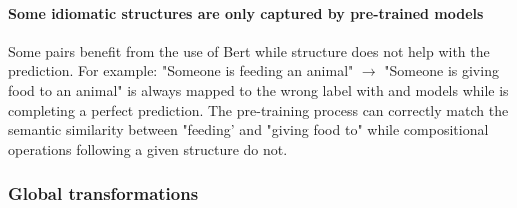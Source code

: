 \paragraph{Some idiomatic structures are only captured by pre-trained models}

Some pairs benefit from the use of Bert while structure does not help with the prediction. For example: "Someone is feeding an animal" $\rightarrow$ "Someone is giving food to an animal" is always mapped to the wrong label with \dep and \const models while \cls is completing a perfect prediction. The \bert pre-training process can correctly match the semantic similarity between "feeding' and "giving food to" while compositional operations following a given structure do not.

\subsubsection{Global transformations} 



